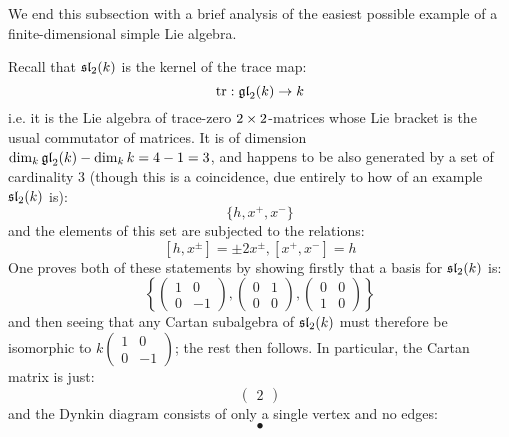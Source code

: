         We end this subsection with a brief analysis of the easiest possible example of a finite-dimensional simple Lie algebra. 
        \begin{example}[$\sl_2$]
            Recall that $\sl_2(k)$ is the kernel of the trace map:
                $$\trace: \gl_2(k) \to k$$
            i.e. it is the Lie algebra of trace-zero $2 \x 2$-matrices whose Lie bracket is the usual commutator of matrices. It is of dimension $\dim_k \gl_2(k) - \dim_k k = 4 - 1 = 3$, and happens to be also generated by a set of cardinality $3$ (though this is a coincidence, due entirely to how  of an example $\sl_2(k)$ is):
                $$\{h, x^+, x^-\}$$
            and the elements of this set are subjected to the relations:
                $$[h, x^{\pm}] = \pm 2 x^{\pm}, [x^+, x^-] = h$$
            One proves both of these statements by showing firstly that a basis for $\sl_2(k)$ is:
                $$\left\{ \begin{pmatrix} 1 & 0 \\ 0 & -1 \end{pmatrix}, \begin{pmatrix} 0 & 1 \\ 0 & 0 \end{pmatrix}, \begin{pmatrix} 0 & 0 \\ 1 & 0 \end{pmatrix} \right\}$$
            and then seeing that any Cartan subalgebra of $\sl_2(k)$ must therefore be isomorphic to $k \begin{pmatrix} 1 & 0 \\ 0 & -1 \end{pmatrix}$; the rest then follows. In particular, the Cartan matrix is just:
                $$\begin{pmatrix} 2 \end{pmatrix}$$
            and the Dynkin diagram consists of only a single vertex and no edges:
                $$\bullet$$
        \end{example}

